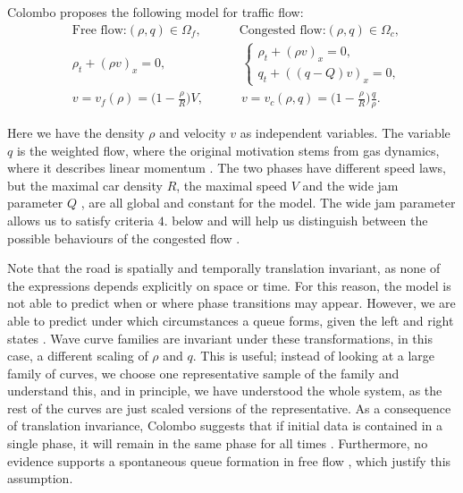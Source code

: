 \documentclass[10pt]{article}
\numberwithin{equation}{section}
\begin{document}
Colombo proposes the following model for traffic flow: 
\begin{align}
    & \text{Free flow:}  (\rho, q) \in \Omega_f, \quad \quad \quad \text{Congested flow:} (\rho, q) \in \Omega_c, \nonumber \\
    & \rho_t + (\rho v )_x = 0, \quad \quad   \quad \quad \quad \quad 
    \begin{cases}
    \rho_t + (\rho v )_x = 0 , \\
    q_t + ((q-Q)v)_x = 0 ,
    \end{cases} \label{Eq:phase-transition} \\
    & v = v_f(\rho) = \big(1- \frac{\rho}{R}\big)V, \quad \quad \quad v = v_c(\rho,q) = \big(1 - \frac{\rho}{R}\big)\frac{q}{\rho}. \nonumber
\end{align}

Here we have the density $\rho$ and velocity $v$ as independent variables. The variable $q$ is the weighted flow, where the original motivation stems from gas dynamics, where it describes linear momentum \cite{Bressan}. The two phases have different speed laws, but the maximal car density $R$, the maximal speed $V$ and the wide jam parameter $Q$ \cite{GaravelloMauro2006Tfon}, are all global and constant for the model. The wide jam parameter allows us to satisfy criteria $4.$ below and will help us distinguish between the possible behaviours of the congested flow \cite{Colombo2003}. 

Note that the road is spatially and temporally translation invariant,  as none of the expressions depends explicitly on space or time. For this reason, the model is not able to predict when or where phase transitions may appear. However, we are able to predict under which circumstances a queue forms, given the left and right states \cite{Colombo2003}. Wave curve families are invariant under these transformations, in this case, a different scaling of $\rho$ and $q$. This is useful; instead of looking at a  large family of curves, we choose one representative sample of the family and understand this, and in principle, we have understood the whole system, as the rest of the curves are just scaled versions of the representative. As a consequence of translation invariance, Colombo suggests that if initial data is contained in a single phase, it will remain in the same phase for all times \cite{Colombo2003}. Furthermore, no evidence supports a spontaneous queue formation in free flow \cite{DAGANZO}, which justify this assumption.
\end{document}
